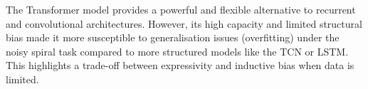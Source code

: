 The Transformer model provides a powerful and flexible alternative to recurrent and convolutional architectures. However, its high capacity and limited structural bias made it more susceptible to generalisation issues (overfitting) under the noisy spiral task compared to more structured models like the TCN or LSTM. This highlights a trade-off between expressivity and inductive bias when data is limited.